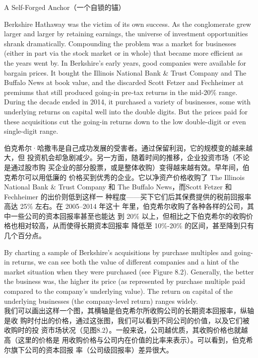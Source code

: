 \begin{section}{A Self-Forged Anchor（一个自锁的锚）}

\begin{verseparallel}
  {
    Berkshire Hathaway was the victim of its own success. As the conglomerate
    grew larger and larger by retaining earnings, the universe of investment
    opportunities shrank dramatically. Compounding the problem was a market
    for businesses (either in part via the stock market or in whole) that
    became more efficient as the years went by. In Berkshire's early years,
    good companies were available for bargain prices. It bought the Illinois
    National Bank \& Trust Company and The Buffalo News at book value, and the
    discarded Scott Fetzer and Fechheimer at premiums that still produced
    going-in pre-tax returns in the mid-20\% range. During the decade ended in
    2014, it purchased a variety of businesses, some with underlying returns
    on capital well into the double digits. But the prices paid for these
    acquisitions cut the going-in returns down to the low double-digit or even
    single-digit range. \\
  }
  {

    伯克希尔·哈撒韦是自己成功发展的受害者。通过保留利润，它的规模变的越来越大，但
    投资机会却急剧减少。另一方面，随着时间的推移，企业投资市场（不论是通过股市购
    买企业的部分股票，或是整体收购）变得越来越有效。早年间，伯克希尔可以用低廉的
    价格买到优秀的企业。它以净资产价格收购了 The Illinois National Bank \& Trust
    Company 和 The Buffalo News，而Scott Fetzer 和 Fechheimer 的出价则低到这样一
    种程度——买下它们后其保费提供的税前回报率高达 25\% 左右。在 2005--2014 年这十
    年里，伯克希尔收购了各种各样的公司，其中一些公司的资本回报率甚至也能达
    到 20\% 以上，但相比之下伯克希尔的收购价格也相对较高，从而使得长期资本回报率
    降低至 10\%-20\% 的区间，甚至降到只有几个百分点。

  }
\end{verseparallel}

\begin{verseparallel}
  {
    By charting a sample of Berkshire's acquisitions by purchase multiples and
    going-in returns, we can see both the value of different companies and a
    hint of the market situation when they were purchased (see Figure 8.2).
    Generally, the better the business was, the higher its price (as represented
    by purchase multiple paid compared to the company's underlying value). The
    return on capital of the underlying businesses (the company-level return)
    ranges widely. \\
  }
  {
    我们可以画出这样一个图，其横轴是伯克希尔所收购公司的长期资本回报率，纵轴是收
    购时付出的价格，通过这张图，我们可以看到不同公司的价值，以及它们被收购时的投
    资市场状况（见图8.2）。一般来说，公司越优质，其收购价格也就越高（这里的价格是
    用收购价格与公司内在价值的比率来表示）。可以看到，伯克希尔旗下公司的资本回报
    率（公司级回报率）差异很大。
  }


\end{verseparallel}
\end{section}
